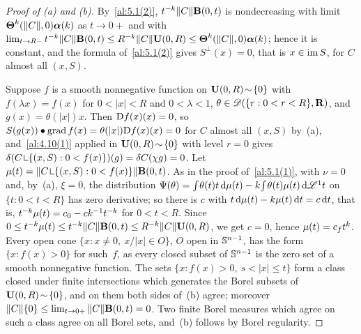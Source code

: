 \begin{proof}[Proof of (a) and (b)]
    By~\ref{al:5.1(2)}, $t^{-k} \|C\| \mathbf{B}(0,t)$ is nondecreasing with limit
    $\boldsymbol{\Theta}^{k}(\|C\|,0) \boldsymbol{\alpha}(k)$ as $t \to 0+$ and with $\lim_{t \to R-}
    t^{-k} \|C\| \mathbf{B}(0,t) \le R^{-k} \|C\| \mathbf{U}(0,R) \le
    \boldsymbol{\Theta}^{k}(\|C\|,0) \boldsymbol{\alpha}(k)$; hence it is constant, and the formula
    of~\ref{al:5.1(2)} gives $S^\perp(x) = 0$, that is $x \in \operatorname{im} S$, for $C$ almost all $(x,S)$.

    Suppose $f$ is a smooth nonnegative function on $\mathbf{U}(0,R) \!\sim\! \{0\}$ with $f(\lambda
    x) = f(x)$ for $0 < |x| < R$ and $0 < \lambda < 1$, $\theta \in \mathscr{D}(\{ r : 0 < r < R
    \},\mathbf{R})$, and $g(x) = \theta(|x|) x$. Then $\mathrm{D} f(x)(x) = 0$, so $S(g(x)) \bullet \operatorname{grad} f(x) =
    \theta(|x|) \mathrm{D} f(x)(x) = 0$ for $C$ almost all $(x,S)$ by~(a), and~\ref{al:4.10(1)} applied in
    $\mathbf{U}(0,R) \!\sim\! \{0\}$ with level $r = 0$ gives $\delta(C \restrict \{ (x,S) : 0 < f(x)
    \})(g) = \delta C(\chi g) = 0$. Let $\mu(t) = \|C \restrict \{ (x,S) : 0 < f(x) \}\|
    \cball{0}{t}$. As in the proof of~\ref{al:5.1(1)}, with $\nu = 0$ and, by~(a), $\xi = 0$, the
    distribution $\Psi(\theta) = {\textstyle\int_{}^{}} \theta(t) t \,\mathrm{d} \mu(t) - k {\textstyle\int_{}^{}}
    \theta(t) \mu(t) \,\mathrm{d} \mathscr{L}^1 t$ on $\{ t : 0 < t < R \}$ has zero derivative; so there is $c$
    with $t \,\mathrm{d} \mu(t) - k \mu(t) \,\mathrm{d} t = c \,\mathrm{d} t$, that is, $t^{-k} \mu(t) = c_0 - c
    k^{-1} t^{-k}$ for $0 < t < R$. Since $0 \le t^{-k} \mu(t) \le t^{-k} \|C\|
    \mathbf{B}(0,t) \le R^{-k} \|C\| \mathbf{U}(0,R)$, we get $c = 0$, hence $\mu(t) = c_f
    t^{k}$. Every open cone $\{ x : x \ne 0,\ x / |x| \in O \}$, $O$ open in
    $\mathbb{S}^{n-1}$, has the form $\{ x : f(x) > 0 \}$ for such~$f$, as every closed subset of
    $\mathbb{S}^{n-1}$ is the zero set of a smooth nonnegative function. The sets $\{ x : f(x) >
    0,\ s < |x| \le t \}$ form a class closed under finite intersections which generates the Borel
    subsets of $\mathbf{U}(0,R) \!\sim\! \{0\}$, and on them both sides of~(b) agree; moreover
    $\|C\|\{0\} \le \lim_{t \to 0+} \|C\| \mathbf{B}(0,t) = 0$. Two finite Borel measures which agree
    on such a class agree on all Borel sets, and~(b) follows by Borel regularity.
\end{proof}

